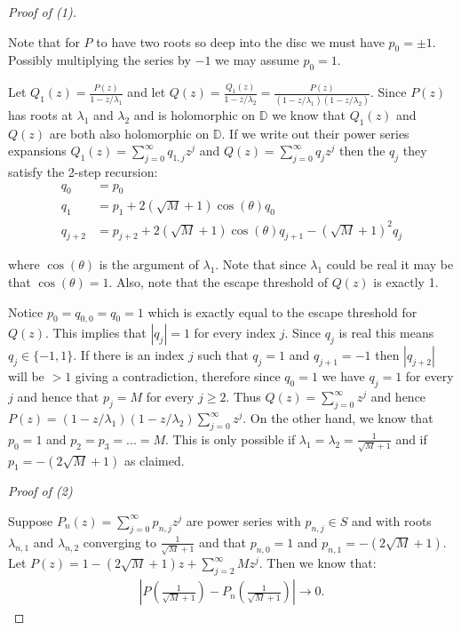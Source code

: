 \documentclass[11pt]{amsart}
\numberwithin{theorem}{section} %
\numberwithin{corollary}{section}
\numberwithin{lemma}{section}
\numberwithin{proposition}{section}
\numberwithin{definition}{section}
\begin{document}
\begin{proof}[Proof of (1)]

\

Note that for $P$ to have two roots so deep into the disc we must have $p_0 = \pm 1$. Possibly multiplying the series by $-1$ we may assume $p_0 = 1$. 

Let $Q_1(z) = \frac{P(z)}{1-z/\lambda_1}$ and let $Q(z) = \frac{Q_1(z)}{1-z/\lambda_2} = \frac{P(z)}{(1-z/\lambda_1)(1-z/\lambda_2)}$. Since $P(z)$ has roots at $\lambda_1$ and $\lambda_2$ and is holomorphic on $\mathbb{D}$ we know that $Q_1(z)$ and $Q(z)$ are both also holomorphic on $\mathbb{D}$. If we write out their power series expansions $Q_1(z) = \sum_{j=0}^\infty q_{1, j}z^j$ and $Q(z) = \sum_{j=0}^\infty q_jz^j$ then the $q_j$ they satisfy the 2-step recursion:
\begin{align*}
q_0 &= p_0 \\
q_1 &= p_1 + 2(\sqrt{M}+1)\cos(\theta)q_0 \\
q_{j+2} &= p_{j+2} + 2(\sqrt{M}+1)\cos(\theta)q_{j+1} - (\sqrt{M}+1)^2q_j
\end{align*}

where $\cos(\theta)$ is the argument of $\lambda_1$. Note that since $\lambda_1$ could be real it may be that $\cos(\theta) = 1$. Also, note that the escape threshold of $Q(z)$ is exactly 1.

Notice $p_0 = q_{0, 0} = q_0 = 1$ which is exactly equal to the escape threshold for $Q(z)$. This implies that $|q_j| = 1$ for every index $j$. Since $q_j$ is real this means $q_j \in \{-1, 1 \}$. If there is an index $j$ such that $q_j = 1$ and $q_{j+1} = -1$ then $|q_{j+2}|$ will be $> 1$ giving a contradiction, therefore since $q_0 = 1$ we have $q_j = 1$ for every $j$ and hence that $p_j = M$ for every $j \geqslant 2$. Thus $Q(z) = \sum_{j=0}^\infty z^j$ and hence $P(z) = (1-z/\lambda_1)(1-z/\lambda_2)\sum_{j=0}^\infty z^j$. On the other hand, we know that $p_0 = 1$ and $p_2 = p_3 = ... = M$. This is only possible if $\lambda_1 = \lambda_2 = \frac{1}{\sqrt{M}+1}$ and if $p_1 = -(2\sqrt{M} + 1)$ as claimed.



\bigskip
\noindent \textit{Proof of (2)}


Suppose $P_n(z) = \sum_{j=0}^\infty p_{n, j}z^j$ are power series with $p_{n, j} \in S$ and with roots $\lambda_{n, 1}$ and $\lambda_{n, 2}$ converging to $\frac{1}{\sqrt{M} + 1}$ and that $p_{n, 0} = 1$ and $p_{n, 1} = -(2\sqrt{M} + 1)$. Let $P(z) = 1-(2\sqrt{M}+1)z + \sum_{j=2}^\infty Mz^j$. Then we know that:
\begin{align*}
|P(\frac{1}{\sqrt{M} + 1}) - P_n(\frac{1}{\sqrt{M}+1}) | \rightarrow 0.
\end{align*}


\end{proof}
\end{document}
